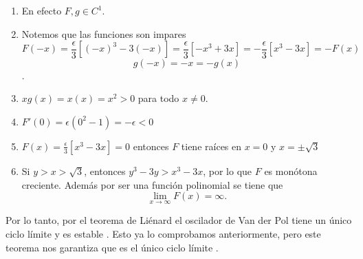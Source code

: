 \begin{enumerate}
	\item En efecto $F,g\in C^1$.
	\item Notemos que las funciones son impares
	      $$F(-x)=\frac{\epsilon}{3}[(-x)^3-3(-x)]=\frac{\epsilon}{3}[-x^3+3x]=-\frac{\epsilon}{3}[x^3-3x]=-F(x)$$
	      $$g(-x)=-x=-g(x)$$.
	\item $xg(x)=x(x)=x^2>0$ para todo $x\neq 0$.
	\item $F'(0)=\epsilon(0^2-1)=-\epsilon<0$
	\item $F(x)=\frac{\epsilon}{3}[x^3-3x]=0$ entonces $F$ tiene raíces en $x=0$ y  $x=\pm \sqrt{3}$
	\item Si $y>x>\sqrt{3}$, entonces $y^3-3y>x^3-3x$, por lo que $F$ es monótona creciente. Además
	      por ser una función polinomial se tiene que
	      $$\lim_{x\to\infty}F(x)=\infty.$$
\end{enumerate}
Por lo tanto, por el teorema de Liénard el oscilador de Van der Pol tiene un único ciclo límite y es estable \cite{hale1980ordinary}.
Esto ya lo comprobamos anteriormente, pero este teorema nos garantiza que es el único ciclo límite \cite{khalil2002nonlinear}.
